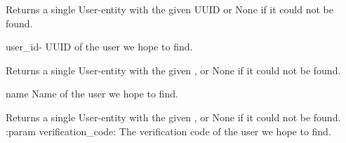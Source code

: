 \documentclass[letterpaper,10pt,english]{sphinxmanual}
\begin{document}

\begin{fulllineitems}
\label{\detokenize{pydash_app.user:pydash_app.user.find}}
Returns a single User-entity with the given UUID or None if it could not be found.

user\_id- UUID of the user we hope to find.

\end{fulllineitems}


\begin{fulllineitems}
\label{\detokenize{pydash_app.user:pydash_app.user.find_by_name}}
Returns a single User-entity with the given , or None if it could not be found.

name \textendash{} Name of the user we hope to find.

\end{fulllineitems}


\begin{fulllineitems}
\label{\detokenize{pydash_app.user:pydash_app.user.find_by_verification_code}}
Returns a single User-entity with the given , or None if it could not be found.
:param verification\_code: The verification code of the user we hope to find.

\end{fulllineitems}

\end{document}
